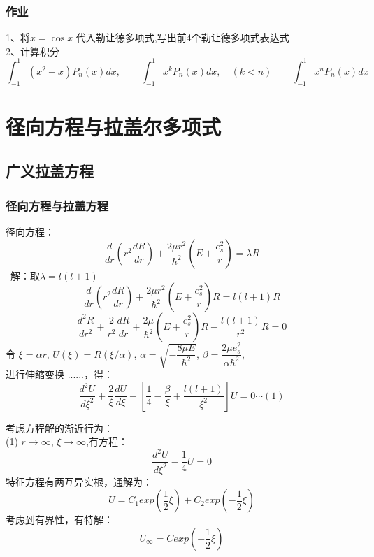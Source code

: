 \begin{frame}
	\frametitle{作业}
	1、将$x=\cos x$ 代入勒让德多项式,写出前4个勒让德多项式表达式 \\
	2、计算积分
	\begin{equation*}
		\int_{-1}^{1} (x^2+x) P_n(x) dx, \qquad \int_{-1}^{1} x^k P_n(x) dx, \quad(k<n) \qquad  	\int_{-1}^{1} x^n P_n(x) dx   
	\end{equation*}
\end{frame}	



\section{径向方程与拉盖尔多项式}

\subsection{广义拉盖方程}

\begin{frame}
	\frametitle{径向方程与拉盖方程}
	径向方程：
	\begin{equation*}
		\frac{d}{d r} (r^2\frac{d R }{d r} ) + \frac{2 \mu r^2} {\hbar^2}(E+ \frac{e_s ^2}{r} ) =\lambda R
	\end{equation*}	
	\alert{ 解：}取$ \lambda =l(l+1)  $
	\begin{equation*}
		\frac{d}{d r} (r^2\frac{d R }{d r} ) + \frac{2 \mu r^2} {\hbar^2}(E+ \frac{e_s ^2}{r} ) R=l(l+1) R
	\end{equation*}	
	\begin{equation*}
		\frac{d^2 R}{d r^2} + \frac{2}{r^2}\frac{d R }{d r}  + \frac{2 \mu} {\hbar^2}(E+ \frac{e_s ^2}{r} ) R- \frac{l(l+1)}{r^2} R=0
	\end{equation*}	
	令 $\xi=\alpha r$, $U(\xi)=R(\xi /\alpha) $, $\alpha =\sqrt{-\dfrac{8\mu E}{\hbar^2}}$, $\beta=\dfrac{2\mu e^2 _s}{\alpha \hbar^2}$,\\
	进行伸缩变换 ......，得：
	\begin{equation*}
		\frac{d^2 U}{d \xi ^2} + \frac{2}{\xi }\frac{d U }{d \xi}  -[ \frac{1} {4}  -\frac{\beta}{\xi} + \frac{l(l+1)}{\xi ^2}] U=0  \cdots (1)
	\end{equation*}	 
\end{frame}	

\begin{frame}
	考虑方程解的渐近行为： \\
	(1) $r\to \infty$, $\xi \to \infty$,有方程：
	\begin{equation*}
		\frac{d^2 U}{d \xi ^2}   - \frac{1} {4}  U=0
	\end{equation*}	
	特征方程有两互异实根，通解为：
	\begin{equation*}
		U=C_1 exp(\frac{1}{2}\xi ) +C_2 exp(-\frac{1}{2}\xi ) 
	\end{equation*}	
	考虑到有界性，有特解：
	\begin{equation*}
		U_\infty  =  C  exp(-\frac{1}{2}\xi ) 
	\end{equation*}	
\end{frame}	

